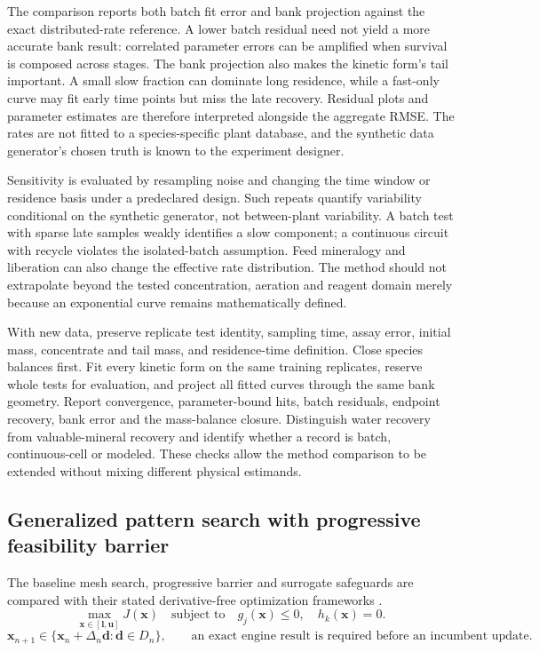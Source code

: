 \documentclass[10pt]{article}
\begin{document}
The comparison reports both batch fit error and bank projection against
the exact distributed-rate reference. A lower batch residual need not
yield a more accurate bank result: correlated parameter errors can be
amplified when survival is composed across stages. The bank projection
also makes the kinetic form's tail important. A small slow fraction can
dominate long residence, while a fast-only curve may fit early time
points but miss the late recovery. Residual plots and parameter
estimates are therefore interpreted alongside the aggregate RMSE. The
rates are not fitted to a species-specific plant database, and the
synthetic data generator's chosen truth is known to the experiment
designer.

Sensitivity is evaluated by resampling noise and changing the time
window or residence basis under a predeclared design. Such repeats
quantify variability conditional on the synthetic generator, not
between-plant variability. A batch test with sparse late samples weakly
identifies a slow component; a continuous circuit with recycle violates
the isolated-batch assumption. Feed mineralogy and liberation can also
change the effective rate distribution. The method should not
extrapolate beyond the tested concentration, aeration and reagent domain
merely because an exponential curve remains mathematically defined.

With new data, preserve replicate test identity, sampling time, assay
error, initial mass, concentrate and tail mass, and residence-time
definition. Close species balances first. Fit every kinetic form on the
same training replicates, reserve whole tests for evaluation, and
project all fitted curves through the same bank geometry. Report
convergence, parameter-bound hits, batch residuals, endpoint recovery,
bank error and the mass-balance closure. Distinguish water recovery from
valuable-mineral recovery and identify whether a record is batch,
continuous-cell or modeled. These checks allow the method comparison to
be extended without mixing different physical estimands.

\subsection{Generalized pattern search with progressive feasibility barrier}
\label{constrained-pattern-search-and-guarded-proposals}

\label{method-optimization}

The baseline mesh search, progressive barrier and surrogate safeguards
are compared with their stated derivative-free optimization frameworks
\cite{torczon1997,audet2006,audet2009,booker1999}. \begin{equation}
\max_{\mathbf{x}\in[\mathbf{l},\mathbf{u}]}J(\mathbf{x})
\quad\text{subject to}\quad
g_j(\mathbf{x})\leq0,\quad h_k(\mathbf{x})=0.
\end{equation} \begin{equation}
\mathbf{x}_{n+1}\in\{\mathbf{x}_n+\Delta_n\mathbf{d}:\mathbf{d}\in D_n\},
\qquad
\text{an exact engine result is required before an incumbent update}.
\end{equation}
\end{document}
